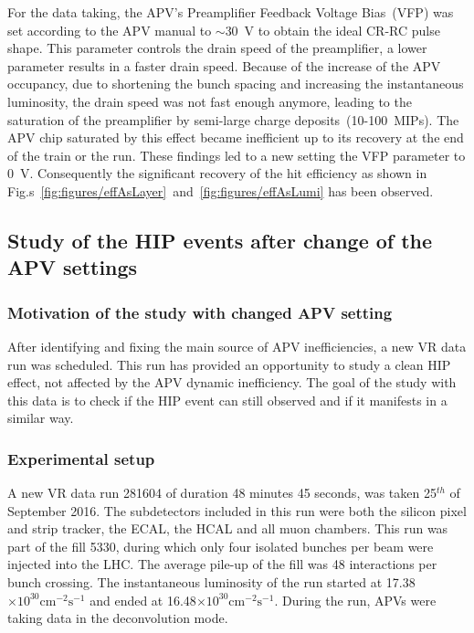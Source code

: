 For the data taking, the APV's Preamplifier Feedback Voltage Bias~(VFP) was set according to the APV manual to $\sim$30~V to obtain the ideal CR-RC pulse shape. This parameter controls the drain speed of the preamplifier, a lower parameter results in a faster drain speed. Because of the increase of the APV occupancy, due to shortening the bunch spacing and increasing the instantaneous luminosity, the drain speed was not fast enough anymore, leading to the saturation of the preamplifier by semi-large charge deposits~(10-100~MIPs). The APV chip saturated by this effect became inefficient up to its recovery at the end of the train or the run. These findings led to a new setting the VFP parameter to 0~V. Consequently the significant recovery of the hit efficiency as shown in Fig.s~\ref{fig:figures/effAsLayer}~and~\ref{fig:figures/effAsLumi} has been observed.


\subsection{Study of the HIP events after change of the APV settings}

\subsubsection{Motivation of the study with changed APV setting}

After identifying and fixing the main source of APV inefficiencies, a new VR data run was scheduled. This run has provided an opportunity to study a clean HIP effect, not affected by the APV dynamic inefficiency. The goal of the study with this data is to check if the HIP event can still observed and if it manifests in a similar way.


\subsubsection{Experimental setup}

A new VR data run 281604 of duration 48 minutes 45 seconds, was taken 25$^{th}$ of September 2016. The subdetectors included in this run were both the silicon pixel and strip tracker, the ECAL, the HCAL and all muon chambers. This run was part of the fill 5330, during which only four isolated bunches per beam were injected into the LHC. The average pile-up of the fill was 48 interactions per bunch crossing. The instantaneous luminosity of the run started at 17.38$\times 10^{30} \mathrm{cm^{-2} s^{-1}}$ and ended at 16.48$\times 10^{30} \mathrm{cm^{-2} s^{-1}}$. During the run, APVs were taking data in the deconvolution mode. 

